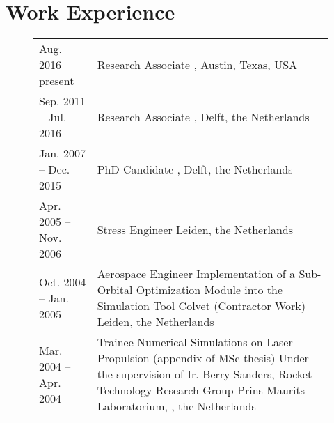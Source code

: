 \documentclass[a4paper]{article}
\newcommand{\dynhref}[2]{%
  \iftoggle{expliciturl}{%
    #2 (\href{#1}{\texttt{\detokenize{#1}}})%
  }{%
    \href{#1}{#2}%
  }%
}
\newlength{\listskipbig}
\newenvironment{cvsection}[2]{
  \setlength{\floatsep}{0pt}
  \setlength{\textfloatsep}{0pt}
  \setlength{\intextsep}{0pt}
  \section*{#1}
  \begin{figure}[H]
  \begin{longtable}{lp{#2}}
}{
  \end{longtable}
  \end{figure}
}
\begin{document}
\begin{cvsection}{Work Experience}{10.8cm}

Aug. 2016 -- present
  & Research Associate\newline
    \dynhref{http://www.csr.utexas.edu}{Center for Space Research}, \dynhref{http://www.utexas.edu}{Texas University at Austin}\newline
    Austin, Texas, USA\\[\listskipbig]

Sep. 2011 -- Jul. 2016
  & Research Associate\newline
    \dynhref{http://www.as.lr.tudelft.nl}{Astrodynamics and Space Missions}, \dynhref{http://www.tudelft.nl/}{Delft University of Technology}\newline
    Delft, the Netherlands\\[\listskipbig]

Jan. 2007 -- Dec. 2015
  & PhD Candidate\newline
    \dynhref{http://tinyurl.com/GRS-TUDelft}{Geoscience \& Remote Sensing}, \dynhref{http://www.tudelft.nl/}{Delft University of Technology}\newline
    Delft, the Netherlands\\[\listskipbig]

Apr. 2005 -- Nov. 2006
  & Stress Engineer\newline
    \dynhref{http://www.globaltechnics.nl/}{Global Technics}\newline
    Leiden, the Netherlands\\[\listskipbig]


Oct. 2004 -- Jan. 2005
  & Aerospace Engineer\newline
  Implementation of a Sub-Orbital Optimization Module into the Simulation Tool Colvet (Contractor Work)\newline
  \dynhref{http://www.delta-utec.com/}{Delta-Utec}\newline
  Leiden, the Netherlands\\[\listskipbig]

Mar. 2004 -- Apr. 2004
  & Trainee\newline
    Numerical Simulations on Laser Propulsion (appendix of MSc thesis)\newline
    Under the supervision of Ir. Berry Sanders, Rocket Technology Research Group\newline
    Prins Maurits Laboratorium, \dynhref{http://www.tno.nl/}{TNO}, the Netherlands\\[\listskipbig]


\end{cvsection}
\end{document}
